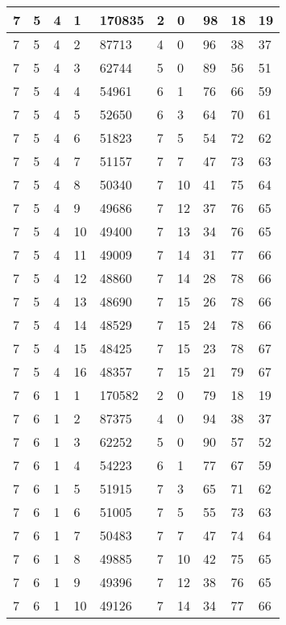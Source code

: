 \begin{table}[!ht]
\begin{tabular}{|l|l|l|l|l|l|l|l|l|l|}
        7 & 5 & 4 & 1 & 170835 & 2 & 0 & 98 & 18 & 19 \\ \hline
        7 & 5 & 4 & 2 & 87713 & 4 & 0 & 96 & 38 & 37 \\ \hline
        7 & 5 & 4 & 3 & 62744 & 5 & 0 & 89 & 56 & 51 \\ \hline
        7 & 5 & 4 & 4 & 54961 & 6 & 1 & 76 & 66 & 59 \\ \hline
        7 & 5 & 4 & 5 & 52650 & 6 & 3 & 64 & 70 & 61 \\ \hline
        7 & 5 & 4 & 6 & 51823 & 7 & 5 & 54 & 72 & 62 \\ \hline
        7 & 5 & 4 & 7 & 51157 & 7 & 7 & 47 & 73 & 63 \\ \hline
        7 & 5 & 4 & 8 & 50340 & 7 & 10 & 41 & 75 & 64 \\ \hline
        7 & 5 & 4 & 9 & 49686 & 7 & 12 & 37 & 76 & 65 \\ \hline
        7 & 5 & 4 & 10 & 49400 & 7 & 13 & 34 & 76 & 65 \\ \hline
        7 & 5 & 4 & 11 & 49009 & 7 & 14 & 31 & 77 & 66 \\ \hline
        7 & 5 & 4 & 12 & 48860 & 7 & 14 & 28 & 78 & 66 \\ \hline
        7 & 5 & 4 & 13 & 48690 & 7 & 15 & 26 & 78 & 66 \\ \hline
        7 & 5 & 4 & 14 & 48529 & 7 & 15 & 24 & 78 & 66 \\ \hline
        7 & 5 & 4 & 15 & 48425 & 7 & 15 & 23 & 78 & 67 \\ \hline
        7 & 5 & 4 & 16 & 48357 & 7 & 15 & 21 & 79 & 67 \\ \hline
        7 & 6 & 1 & 1 & 170582 & 2 & 0 & 79 & 18 & 19 \\ \hline
        7 & 6 & 1 & 2 & 87375 & 4 & 0 & 94 & 38 & 37 \\ \hline
        7 & 6 & 1 & 3 & 62252 & 5 & 0 & 90 & 57 & 52 \\ \hline
        7 & 6 & 1 & 4 & 54223 & 6 & 1 & 77 & 67 & 59 \\ \hline
        7 & 6 & 1 & 5 & 51915 & 7 & 3 & 65 & 71 & 62 \\ \hline
        7 & 6 & 1 & 6 & 51005 & 7 & 5 & 55 & 73 & 63 \\ \hline
        7 & 6 & 1 & 7 & 50483 & 7 & 7 & 47 & 74 & 64 \\ \hline
        7 & 6 & 1 & 8 & 49885 & 7 & 10 & 42 & 75 & 65 \\ \hline
        7 & 6 & 1 & 9 & 49396 & 7 & 12 & 38 & 76 & 65 \\ \hline
        7 & 6 & 1 & 10 & 49126 & 7 & 14 & 34 & 77 & 66 \\ \hline

\end{tabular}
\end{table}

